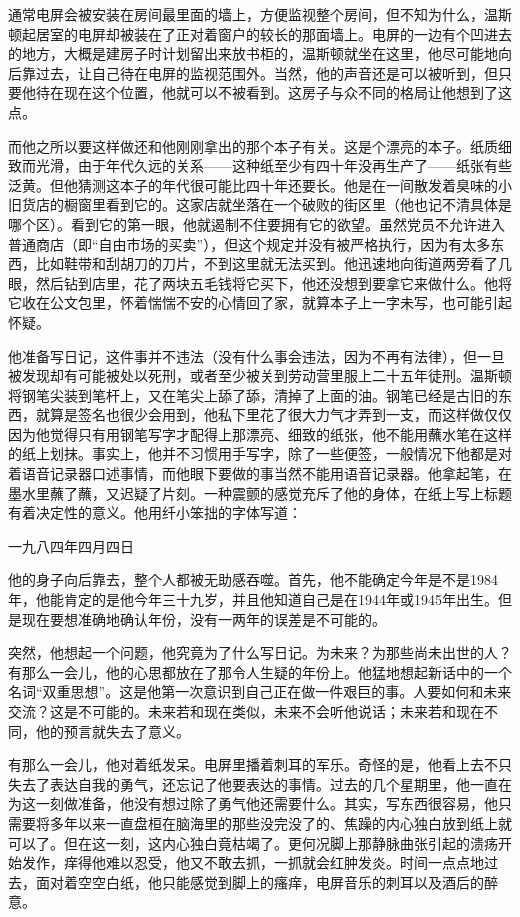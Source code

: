 通常电屏会被安装在房间最里面的墙上，方便监视整个房间，但不知为什么，温斯顿起居室的电屏却被装在了正对着窗户的较长的那面墙上。电屏的一边有个凹进去的地方，大概是建房子时计划留出来放书柜的，温斯顿就坐在这里，他尽可能地向后靠过去，让自己待在电屏的监视范围外。当然，他的声音还是可以被听到，但只要他待在现在这个位置，他就可以不被看到。这房子与众不同的格局让他想到了这点。

而他之所以要这样做还和他刚刚拿出的那个本子有关。这是个漂亮的本子。纸质细致而光滑，由于年代久远的关系------这种纸至少有四十年没再生产了------纸张有些泛黄。但他猜测这本子的年代很可能比四十年还要长。他是在一间散发着臭味的小旧货店的橱窗里看到它的。这家店就坐落在一个破败的街区里（他也记不清具体是哪个区）。看到它的第一眼，他就遏制不住要拥有它的欲望。虽然党员不允许进入普通商店（即``自由市场的买卖''），但这个规定并没有被严格执行，因为有太多东西，比如鞋带和刮胡刀的刀片，不到这里就无法买到。他迅速地向街道两旁看了几眼，然后钻到店里，花了两块五毛钱将它买下，他还没想到要拿它来做什么。他将它收在公文包里，怀着惴惴不安的心情回了家，就算本子上一字未写，也可能引起怀疑。

他准备写日记，这件事并不违法（没有什么事会违法，因为不再有法律），但一旦被发现却有可能被处以死刑，或者至少被关到劳动营里服上二十五年徒刑。温斯顿将钢笔尖装到笔杆上，又在笔尖上舔了舔，清掉了上面的油。钢笔已经是古旧的东西，就算是签名也很少会用到，他私下里花了很大力气才弄到一支，而这样做仅仅因为他觉得只有用钢笔写字才配得上那漂亮、细致的纸张，他不能用蘸水笔在这样的纸上划抹。事实上，他并不习惯用手写字，除了一些便签，一般情况下他都是对着语音记录器口述事情，而他眼下要做的事当然不能用语音记录器。他拿起笔，在墨水里蘸了蘸，又迟疑了片刻。一种震颤的感觉充斥了他的身体，在纸上写上标题有着决定性的意义。他用纤小笨拙的字体写道：

一九八四年四月四日

他的身子向后靠去，整个人都被无助感吞噬。首先，他不能确定今年是不是1984年，他能肯定的是他今年三十九岁，并且他知道自己是在1944年或1945年出生。但是现在要想准确地确认年份，没有一两年的误差是不可能的。

突然，他想起一个问题，他究竟为了什么写日记。为未来？为那些尚未出世的人？有那么一会儿，他的心思都放在了那令人生疑的年份上。他猛地想起新话中的一个名词``双重思想''。这是他第一次意识到自己正在做一件艰巨的事。人要如何和未来交流？这是不可能的。未来若和现在类似，未来不会听他说话；未来若和现在不同，他的预言就失去了意义。

有那么一会儿，他对着纸发呆。电屏里播着刺耳的军乐。奇怪的是，他看上去不只失去了表达自我的勇气，还忘记了他要表达的事情。过去的几个星期里，他一直在为这一刻做准备，他没有想过除了勇气他还需要什么。其实，写东西很容易，他只需要将多年以来一直盘桓在脑海里的那些没完没了的、焦躁的内心独白放到纸上就可以了。但在这一刻，这内心独白竟枯竭了。更何况脚上那静脉曲张引起的溃疡开始发作，痒得他难以忍受，他又不敢去抓，一抓就会红肿发炎。时间一点点地过去，面对着空空白纸，他只能感觉到脚上的瘙痒，电屏音乐的刺耳以及酒后的醉意。


